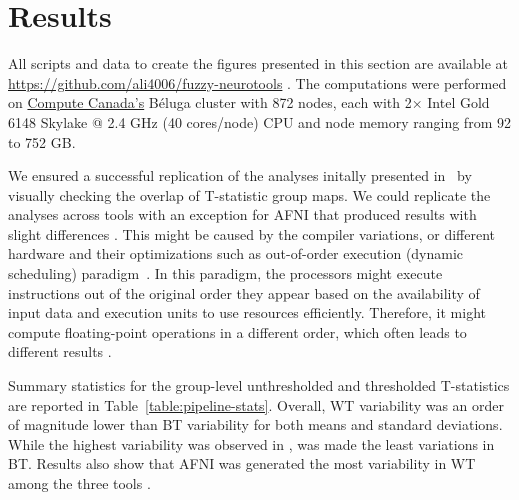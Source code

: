 \documentclass[conference]{IEEEtran}
\begin{document}
\section{Results}
All scripts and data to create the figures presented in this section are available at \url{https://github.com/ali4006/fuzzy-neurotools} .
The computations were performed on \href{https://www.computecanada.ca}{Compute Canada's} Béluga cluster
with 872 nodes, each with 2× Intel Gold 6148 Skylake @ 2.4 GHz (40 cores/node) CPU and node memory ranging from 92 to 752 GB.

We ensured a successful replication of the analyses initally presented in~\cite{bowring2019exploring}
by visually checking the overlap  of T-statistic group maps.
We could replicate the analyses across tools with an exception for AFNI that produced results with slight differences . 
This might be caused by the compiler variations, or different hardware and their optimizations
such as out-of-order execution (dynamic scheduling) paradigm~\cite{duben2014use,demmel2013numerical}.
In this paradigm, the processors might execute instructions out of the original order they appear based on
the availability of input data and execution units to use resources efficiently. Therefore, it might
compute floating-point operations in a different order, which often leads to different results .

Summary statistics for the group-level unthresholded and thresholded T-statistics  are reported in Table~\ref{table:pipeline-stats}.
Overall, WT variability was an order of magnitude lower than BT variability for both means and standard deviations.
While the highest variability was observed in \fslafni, \fslspm was made the least variations in BT.
Results also show that AFNI was generated the most variability in WT among the three tools .
\end{document}
